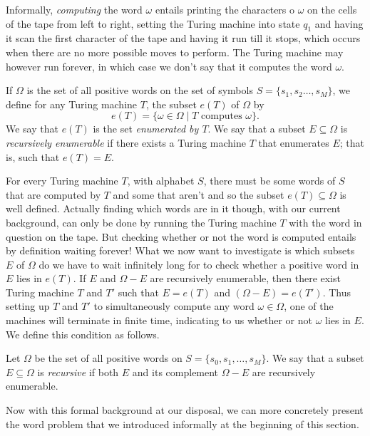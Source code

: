 Informally, \emph{computing} the word $\omega$ entails printing the characters o $\omega$ on the cells of the tape from left to right, setting the Turing machine into state $q_1$ and having it scan the first character of the tape and having it run till it stops, which occurs when there are no more possible moves to perform. The Turing machine may however run forever, in which case we don't say that it computes the word $\omega$.

\begin{definition}
  If $\Omega$ is the set of all positive words on the set of symbols $S = \{s_1, s_2 \dots, s_M\}$, we define for any Turing machine $T$, the subset $e(T)$ of $\Omega$ by
  \begin{equation*}
    e(T) = \{\omega \in \Omega \mid T \text{ computes } \omega\}.
  \end{equation*}
  We say that $e(T)$ is the set \emph{enumerated by $T$}. We say that a subset $E \subseteq \Omega$ is \emph{recursively enumerable} if there exists a Turing machine $T$ that enumerates $E$; that is, such that  $e(T) = E$.
\end{definition}

For every Turing machine $T$, with alphabet $S$, there must be some words of $S$ that are computed by $T$ and some that aren't and so the subset $e(T) \subseteq \Omega$ is well defined. Actually finding which words are in it though, with our current background, can only be done by running the Turing machine $T$ with the word in question on the tape. But checking whether or not the word is computed entails by definition waiting forever! What we now want to investigate is which subsets $E$ of $\Omega$ do we have to wait infinitely long for to check whether a positive word in $E$ lies in $e(T)$. If $E$ and $\Omega - E$ are recursively enumerable, then there exist Turing machine $T$ and $T'$ such that $E = e(T)$ and $(\Omega - E) = e(T')$. Thus setting up $T$ and $T'$ to simultaneously compute any word $\omega \in \Omega$, one of the machines will terminate in finite time, indicating to us whether or not $\omega$ lies in $E$. We define this condition as follows.

\begin{definition}
  Let $\Omega$ be the set of all positive words on $S = \{s_0,s_1, \dots, s_M \}$. We say that a subset $E \subseteq \Omega$ is \emph{recursive} if both $E$ and its complement $\Omega - E$ are recursively enumerable.
\end{definition}

Now with this formal background at our disposal, we can more concretely present the word problem that we introduced informally at the beginning of this section.

